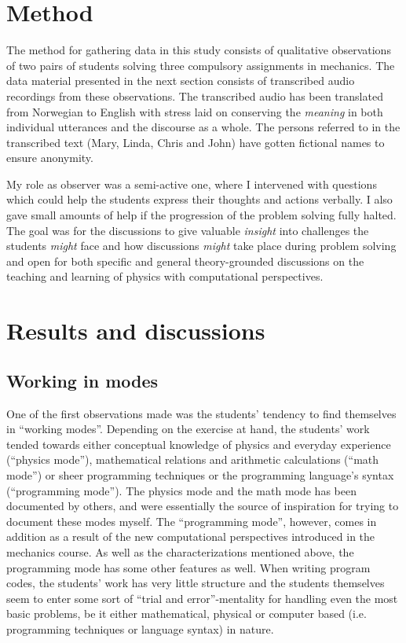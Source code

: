 \documentclass[aps,prb,floatfix,twocolumn,twoside,english]{revtex4-1}
\begin{document}
\section{Method}
\label{sec:method}
The method for gathering data in this study consists of qualitative observations of two pairs of students solving three compulsory assignments in mechanics. The data material presented in the next section consists of transcribed audio recordings from these observations. The transcribed audio has been translated from Norwegian to English with stress laid on conserving the \textit{meaning} in both individual utterances and the discourse as a whole. The persons referred to in the transcribed text (Mary, Linda, Chris and John) have gotten fictional names to ensure anonymity.

My role as observer was a semi-active one, where I intervened with questions which could help the students express their thoughts and actions verbally. I also gave small amounts of help if the progression of the problem solving fully halted. The goal was for the discussions to give valuable \textit{insight} into challenges the students \textit{might} face and how discussions \textit{might} take place during problem solving and open for both specific and general theory-grounded discussions on the teaching and learning of physics with computational perspectives.


\section{Results and discussions}
\label{sec:results}
\subsection{Working in modes}
\label{sec:modes}

One of the first observations made was the students' tendency to find themselves in ``working modes''. Depending on the exercise at hand, the students' work tended towards either conceptual knowledge of physics and everyday experience (``physics mode''), mathematical relations and arithmetic calculations (``math mode'') or sheer programming techniques or the programming language's syntax (``programming mode''). The physics mode and the math mode has been documented by others,\cite{Angell:2008} and were essentially the source of inspiration for trying to document these modes myself. The ``programming mode'', however, comes in addition as a result of the new computational perspectives introduced in the mechanics course. As well as the characterizations mentioned above, the programming mode has some other features as well. When writing program codes, the students' work has very little structure and the students themselves seem to enter some sort of ``trial and error''-mentality for handling even the most basic problems, be it either mathematical, physical or computer based (i.e. programming techniques or language syntax) in nature.
\end{document}
